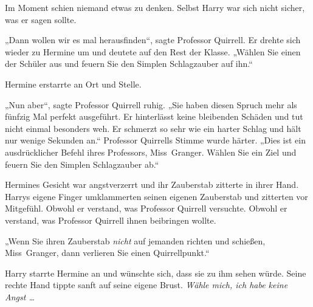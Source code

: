 Im Moment schien niemand etwas zu denken. Selbst Harry war sich nicht sicher, was er sagen sollte.

„Dann wollen wir es mal herausfinden“, sagte Professor Quirrell. Er drehte sich wieder zu Hermine um und deutete auf den Rest der Klasse. „Wählen Sie einen der Schüler aus und feuern Sie den Simplen Schlagzauber auf ihn.“

Hermine erstarrte an Ort und Stelle.

„Nun aber“, sagte Professor Quirrell ruhig. „Sie haben diesen Spruch mehr als fünfzig Mal perfekt ausgeführt. Er hinterlässt keine bleibenden Schäden und tut nicht einmal besonders weh. Er schmerzt so sehr wie ein harter Schlag und hält nur wenige Sekunden an.“ Professor Quirrells Stimme wurde härter. „Dies ist ein ausdrücklicher Befehl ihres Professors, Miss~Granger. Wählen Sie ein Ziel und feuern Sie den Simplen Schlagzauber ab.“

Hermines Gesicht war angstverzerrt und ihr Zauberstab zitterte in ihrer Hand. Harrys eigene Finger umklammerten seinen eigenen Zauberstab und zitterten vor Mitgefühl. Obwohl er verstand, was Professor Quirrell versuchte. Obwohl er verstand, was Professor Quirrell ihnen beibringen wollte.

„Wenn Sie ihren Zauberstab \emph{nicht} auf jemanden richten und schießen, Miss~Granger, dann verlieren Sie einen Quirrellpunkt.“

Harry starrte Hermine an und wünschte sich, dass sie zu ihm sehen würde. Seine rechte Hand tippte sanft auf seine eigene Brust. \emph{Wähle mich, ich habe keine Angst …}

